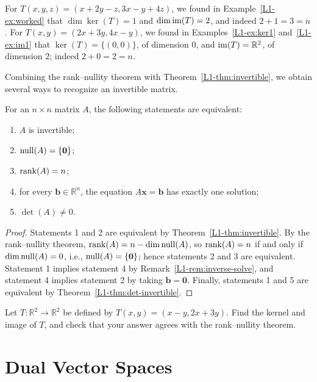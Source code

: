 \begin{example}
    For $T(x, y, z) = (x + 2y - z, 3x - y + 4z)$, we found in Example~\ref{L1-ex:worked} that $\dim \ker(T) = 1$ and $\dim \operatorname{im}(T) = 2$, and indeed $2 + 1 = 3 = n$. For $T(x, y) = (2x + 3y, 4x - y)$, we found in Examples~\ref{L1-ex:ker1} and~\ref{L1-ex:im1} that $\ker(T) = \{(0, 0)\}$, of dimension $0$, and $\operatorname{im}(T) = \mathbb{R}^2$, of dimension $2$; indeed $2 + 0 = 2 = n$.
\end{example}

Combining the rank--nullity theorem with Theorem~\ref{L1-thm:invertible}, we obtain several ways to recognize an invertible matrix.

\begin{corollary}\label{L1-cor:invertible-rank}
    For an $n \times n$ matrix $A$, the following statements are equivalent:
    \begin{enumerate}
        \item $A$ is invertible;
        \item $\operatorname{null}(A) = \{\mathbf{0}\}$;
        \item $\operatorname{rank}(A) = n$;
        \item for every $\mathbf{b} \in \mathbb{R}^n$, the equation $A\mathbf{x} = \mathbf{b}$ has exactly one solution;
        \item $\det(A) \neq 0$.
    \end{enumerate}
\end{corollary}

\begin{proof}
    Statements 1 and 2 are equivalent by Theorem~\ref{L1-thm:invertible}. By the rank--nullity theorem, $\operatorname{rank}(A) = n - \dim \operatorname{null}(A)$, so $\operatorname{rank}(A) = n$ if and only if $\dim \operatorname{null}(A) = 0$, i.e., $\operatorname{null}(A) = \{\mathbf{0}\}$; hence statements 2 and 3 are equivalent. Statement 1 implies statement 4 by Remark~\ref{L1-rem:inverse-solve}, and statement 4 implies statement 2 by taking $\mathbf{b} = \mathbf{0}$. Finally, statements 1 and 5 are equivalent by Theorem~\ref{L1-thm:det-invertible}.
\end{proof}

\begin{exercise}
    Let $T: \mathbb{R}^2 \to \mathbb{R}^2$ be defined by $T(x, y) = (x - y, 2x + 3y)$. Find the kernel and image of $T$, and check that your answer agrees with the rank--nullity theorem.
\end{exercise}

\section{Dual Vector Spaces}\label{L1-sec:dual}

